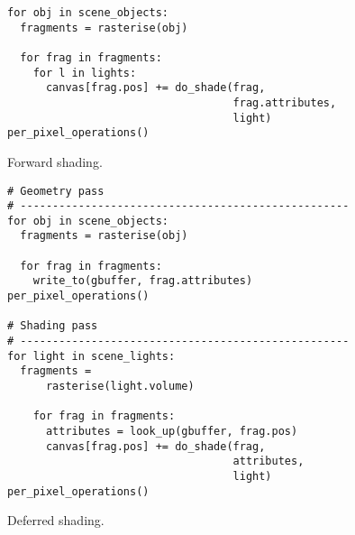 \begin{listing}[tb]
  \begin{verbatim}
for obj in scene_objects:
  fragments = rasterise(obj)

  for frag in fragments:
    for l in lights:
      canvas[frag.pos] += do_shade(frag,
                                   frag.attributes,
                                   light)
per_pixel_operations()
  \end{verbatim}
  \caption{Forward shading.}
  \label{lst:fds-algorithm:forward}
\end{listing}

\begin{listing}[tb]
  \begin{verbatim}
# Geometry pass
# ---------------------------------------------------
for obj in scene_objects:
  fragments = rasterise(obj)
    
  for frag in fragments:
    write_to(gbuffer, frag.attributes) 
per_pixel_operations()

# Shading pass
# ---------------------------------------------------
for light in scene_lights:
  fragments =
      rasterise(light.volume)
    
    for frag in fragments:
      attributes = look_up(gbuffer, frag.pos)
      canvas[frag.pos] += do_shade(frag,
                                   attributes,
                                   light)
per_pixel_operations()
  \end{verbatim}
  \caption{Deferred shading.}
  \label{lst:fds-algorithm:deferred}
\end{listing}

